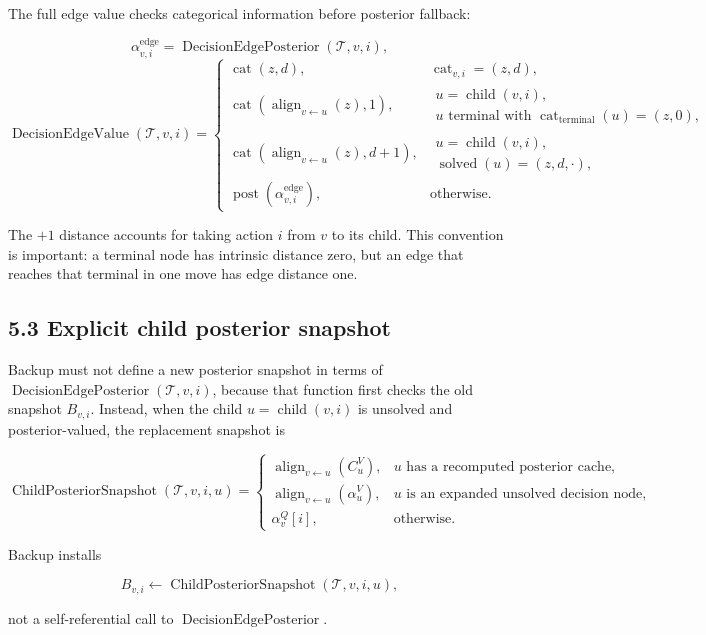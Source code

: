 \documentclass[11pt]{article}
\newcommand{\Tree}{\mathcal{T}}
\newcommand{\Align}{\operatorname{align}}
\newcommand{\Child}{\operatorname{child}}
\newcommand{\Solved}{\operatorname{solved}}
\newcommand{\Cat}{\operatorname{cat}}
\newcommand{\Posterior}{\operatorname{post}}
\newcommand{\DecisionEdgeValue}{\operatorname{DecisionEdgeValue}}
\newcommand{\DecisionEdgePosterior}{\operatorname{DecisionEdgePosterior}}
\newcommand{\ChildPosteriorSnapshot}{\operatorname{ChildPosteriorSnapshot}}
\begin{document}
The full edge value checks categorical information before posterior fallback:

\[
\alpha^{\mathrm{edge}}_{v,i}
=
\DecisionEdgePosterior(\Tree,v,i),
\]
\[
\DecisionEdgeValue(\Tree,v,i)=
\begin{cases}
\Cat(z,d),&\Cat_{v,i}=(z,d),\\[2pt]
\Cat(\Align_{v\leftarrow u}(z),1),
&\begin{array}{l}
u=\Child(v,i),\\
u\text{ terminal with }\Cat_{\mathrm{terminal}}(u)=(z,0),
\end{array}\\[8pt]
\Cat(\Align_{v\leftarrow u}(z),d+1),
&\begin{array}{l}
u=\Child(v,i),\\
\Solved(u)=(z,d,\cdot),
\end{array}\\[8pt]
\Posterior(\alpha^{\mathrm{edge}}_{v,i}),&\text{otherwise}.
\end{cases}
\]


The \(+1\) distance accounts for taking action \(i\) from \(v\) to its child.
This convention is important: a terminal node has intrinsic distance zero, but
an edge that reaches that terminal in one move has edge distance one.

\subsection*{5.3 Explicit child posterior snapshot}

Backup must not define a new posterior snapshot in terms of
\(\DecisionEdgePosterior(\Tree,v,i)\), because that function first checks the old
snapshot \(B_{v,i}\). Instead, when the child \(u=\Child(v,i)\) is unsolved and
posterior-valued, the replacement snapshot is

\[
\ChildPosteriorSnapshot(\Tree,v,i,u)=
\begin{cases}
\Align_{v\leftarrow u}(C^V_u),&u\text{ has a recomputed posterior cache},\\[2pt]
\Align_{v\leftarrow u}(\alpha_u^V),
&u\text{ is an expanded unsolved decision node},\\[2pt]
\alpha_v^Q[i],&\text{otherwise}.
\end{cases}
\]

Backup installs

\[
B_{v,i}\gets\ChildPosteriorSnapshot(\Tree,v,i,u),
\]

not a self-referential call to \(\DecisionEdgePosterior\).
\end{document}
